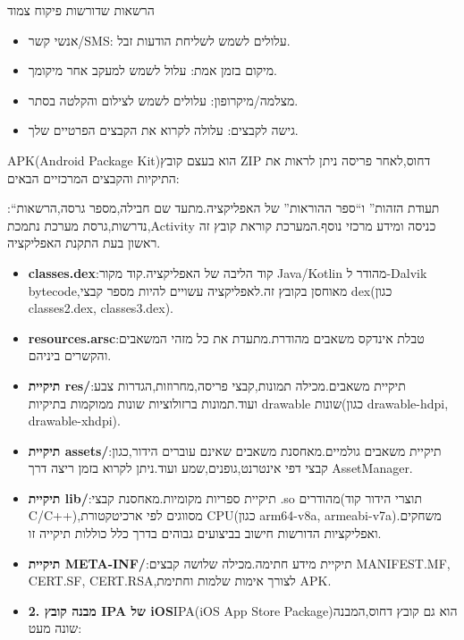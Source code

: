 \begin{tcbwarn}{הרשאות שדורשות פיקוח צמוד}
\begin{itemize}
  \item אנשי קשר/SMS: עלולים לשמש לשליחת הודעות זבל.
  \item מיקום בזמן אמת: עלול לשמש למעקב אחר מיקומך.
  \item מצלמה/מיקרופון: עלולים לשמש לצילום והקלטה בסתר.
  \item גישה לקבצים: עלולה לקרוא את הקבצים הפרטיים שלך.
\end{itemize}

\end{tcbwarn}


APK(Android Package Kit)הוא בעצם קובץ ZIP דחוס,לאחר פריסה ניתן לראות את התיקיות והקבצים המרכזיים הבאים:


:“תעודת הזהות” ו“ספר ההוראות” של האפליקציה.מתעד שם חבילה,מספר גרסה,הרשאות נדרשות,גרסת מערכת נתמכת,Activity כניסה ומידע מרכזי נוסף.המערכת קוראת קובץ זה ראשון בעת התקנת האפליקציה.

\begin{itemize}
  \item \textbf{classes.dex}:קוד הליבה של האפליקציה.קוד מקור Java/Kotlin מהודר ל-Dalvik bytecode,מאוחסן בקובץ זה.לאפליקציה עשויים להיות מספר קבצי dex(כגון classes2.dex, classes3.dex).
  \item \textbf{resources.arsc}:טבלת אינדקס משאבים מהודרת.מתעדת את כל מזהי המשאבים והקשרים ביניהם.
  \item \textbf{תיקיית res/}:תיקיית משאבים.מכילה תמונות,קבצי פריסה,מחרוזות,הגדרות צבע ועוד.תמונות ברזולוציות שונות ממוקמות בתיקיות drawable שונות(כגון drawable-hdpi, drawable-xhdpi).
  \item \textbf{תיקיית assets/}:תיקיית משאבים גולמיים.מאחסנת משאבים שאינם עוברים הידור,כגון קבצי דפי אינטרנט,גופנים,שמע ועוד.ניתן לקרוא בזמן ריצה דרך AssetManager.
  \item \textbf{תיקיית lib/}:תיקיית ספריות מקומיות.מאחסנת קבצי .so מהודרים(תוצרי הידור קוד C/C++),מסווגים לפי ארכיטקטורת CPU(כגון arm64-v8a, armeabi-v7a).משחקים ואפליקציות הדורשות חישוב בביצועים גבוהים בדרך כלל כוללות תיקייה זו.
  \item \textbf{תיקיית META-INF/}:תיקיית מידע חתימה.מכילה שלושה קבצים MANIFEST.MF, CERT.SF, CERT.RSA,לצורך אימות שלמות וחתימת APK.
  \item \textbf{2. מבנה קובץ IPA של iOS}IPA(iOS App Store Package)הוא גם קובץ דחוס,המבנה שונה מעט:
\end{itemize}

